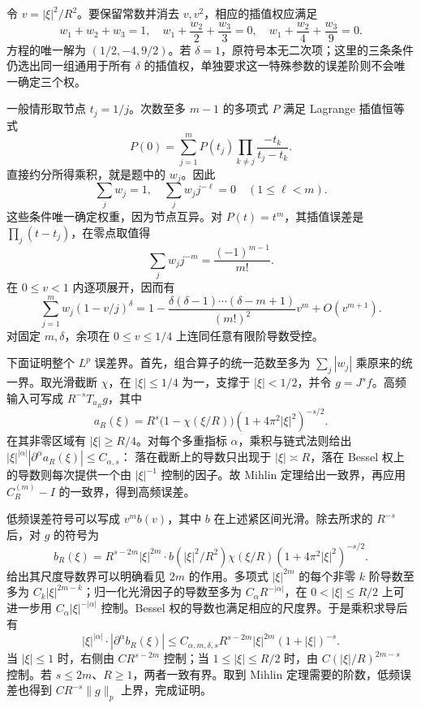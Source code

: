 \begin{solution}
令 \(v=|\xi|^2/R^2\)。要保留常数并消去 \(v,v^2\)，相应的插值权应满足
\[
 w_1+w_2+w_3=1,
 \quad w_1+\frac{w_2}2+\frac{w_3}3=0,
 \quad w_1+\frac{w_2}4+\frac{w_3}9=0.
\]
方程的唯一解为 \((1/2,-4,9/2)\)。若 \(\delta=1\)，原符号本无二次项；这里的三条条件仍选出同一组通用于所有 \(\delta\) 的插值权，单独要求这一特殊参数的误差阶则不会唯一确定三个权。

一般情形取节点 \(t_j=1/j\)。次数至多 \(m-1\) 的多项式 \(P\) 满足 Lagrange 插值恒等式
\[
 P(0)=\sum_{j=1}^mP(t_j)
          \prod_{k\ne j}\frac{-t_k}{t_j-t_k}.
\]
直接约分所得乘积，就是题中的 \(w_j\)。因此
\[
 \sum_jw_j=1,
 \quad \sum_jw_jj^{-\ell}=0\quad(1\leq\ell<m).
\]
这些条件唯一确定权重，因为节点互异。对 \(P(t)=t^m\)，其插值误差是 \(\prod_j(t-t_j)\)，在零点取值得
\[
 \sum_jw_jj^{-m}=\frac{(-1)^{m-1}}{m!}.
\]
在 \(0\leq v<1\) 内逐项展开，因而有
\[
 \sum_{j=1}^m w_j(1-v/j)^\delta
 =1-\frac{\delta(\delta-1)\cdots(\delta-m+1)}{(m!)^2}v^m
       +O(v^{m+1}).
\]
对固定 \(m,\delta\)，余项在 \(0\leq v\leq1/4\) 上连同任意有限阶导数受控。

下面证明整个 \(L^p\) 误差界。首先，组合算子的统一范数至多为
\(\sum_j|w_j|\) 乘原来的统一界。取光滑截断 \(\chi\)，在 \(|\xi|\leq1/4\) 为一，支撑于 \(|\xi|<1/2\)，并令 \(g=J^sf\)。高频输入可写成 \(R^{-s}T_{a_R}g\)，其中
\[
 a_R(\xi)=R^s\bigl(1-\chi(\xi/R)\bigr)
                         (1+4\pi^2|\xi|^2)^{-s/2}.
\]
在其非零区域有 \(|\xi|\geq R/4\)。对每个多重指标 \(\alpha\)，乘积与链式法则给出
\(|\xi|^{|\alpha|}|\partial^\alpha a_R(\xi)|\leq C_{\alpha,s}\)：
落在截断上的导数只出现于 \(|\xi|\asymp R\)，落在 Bessel 权上的导数则每次提供一个由 \(|\xi|^{-1}\) 控制的因子。故 Mihlin 定理给出一致界，再应用 \(C_R^{(m)}-I\) 的一致界，得到高频误差。

低频误差符号可以写成 \(v^m b(v)\)，其中 \(b\) 在上述紧区间光滑。除去所求的 \(R^{-s}\) 后，对 \(g\) 的符号为
\[
 b_R(\xi)=R^{s-2m}|\xi|^{2m}
    \cdot b(|\xi|^2/R^2)\chi(\xi/R)
                     (1+4\pi^2|\xi|^2)^{-s/2}.
\]
给出其尺度导数界可以明确看见 \(2m\) 的作用。多项式 \(|\xi|^{2m}\) 的每个非零 \(k\) 阶导数至多为 \(C_k|\xi|^{2m-k}\)；归一化光滑因子的导数至多为 \(C_\alpha R^{-|\alpha|}\)，在 \(0<|\xi|\leq R/2\) 上可进一步用 \(C_\alpha|\xi|^{-|\alpha|}\) 控制。Bessel 权的导数也满足相应的尺度界。于是乘积求导后有
\[
 |\xi|^{|\alpha|}\cdot|\partial^\alpha b_R(\xi)|
 \leq C_{\alpha,m,\delta,s}
        R^{s-2m}|\xi|^{2m}(1+|\xi|)^{-s}.
\]
当 \(|\xi|\leq1\) 时，右侧由 \(CR^{s-2m}\) 控制；当 \(1\leq|\xi|\leq R/2\) 时，由 \(C(|\xi|/R)^{2m-s}\) 控制。若 \(s\leq2m\)、\(R\geq1\)，两者一致有界。取到 Mihlin 定理需要的阶数，低频误差也得到 \(CR^{-s}\|g\|_p\) 上界，完成证明。


\end{solution}
